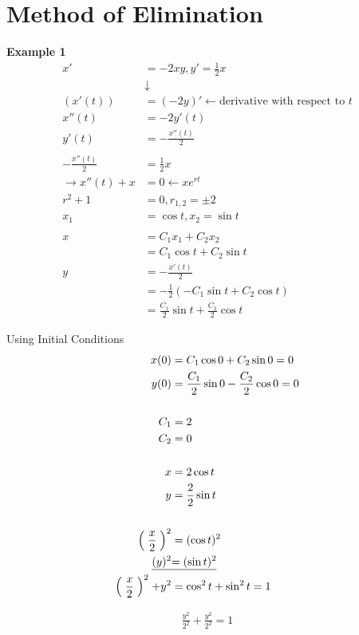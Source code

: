 \documentclass[10pt, letterpaper]{article}
\begin{document}
\section{Method of Elimination}
\textbf{Example 1}\\
\begin{align*}
x' &= -2xy, y'=\frac{1}{2}x\\
&\downarrow\\
(x'(t)) &= (-2y)' \leftarrow \text{derivative with respect to $t$}\\
x''(t) &= -2y'(t)\\
y'(t) &= -\frac{x''(t)}{2}\\
\\
-\frac{x''(t)}{2} &= \frac{1}{2}x\\
\rightarrow x''(t) + x &= 0 \leftarrow xe^{rt}\\
r^2 + 1 &= 0, r_{1, 2} = \pm 2\\
x_1 &= \cos t, x_2 = \sin t\\
\\
x &= C_1x_1 + C_2x_2\\
&= C_1\cos t + C_2\sin t\\
y &= -\frac{x'(t)}{2}\\
&= -\frac{1}{2}(-C_1\sin t +C_2\cos t)\\
&= \frac{C_1}{2}\sin t +\frac{C_2}{2}\cos t
\end{align*}

Using Initial Conditions
\begin{align*}
x(0) &= C_1\cos0 +C_2\sin0 = 0\\
y(0) &= \frac{C_1}{2}\sin0 -\frac{C_2}{2}\cos0 = 0\\
\\
C_1 &= 2\\
C_2 &= 0\\
\\
x &= 2\cos t\\
y &= \frac{2}{2} \sin t\\
\\
\Bigm( \frac{x}{2} \Bigm)^2 &= (\cos t)^2\\
\underline{(y)^2} &\underline{= (\sin t)^2}\\
\Bigm( \frac{x}{2} \Bigm)^2 +y^2 &= \cos^2t +\sin^2t =1
\end{align*}

\begin{align*}
\frac{y^2}{2^2} + \frac{y^2}{2^2} = 1
\end{align*}
\end{document}

